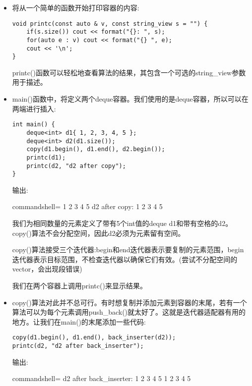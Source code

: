\begin{itemize}
\item 
将从一个简单的函数开始打印容器的内容:

\begin{lstlisting}[style=styleCXX]
void printc(const auto & v, const string_view s = "") {
	if(s.size()) cout << format("{}: ", s);
	for(auto e : v) cout << format("{} ", e);
	cout << '\n';
}
\end{lstlisting}

printc()函数可以轻松地查看算法的结果，其包含一个可选的string\_view参数用于描述。

\item 
main()函数中，将定义两个deque容器。我们使用的是deque容器，所以可以在两端进行插入:

\begin{lstlisting}[style=styleCXX]
int main() {
	deque<int> d1{ 1, 2, 3, 4, 5 };
	deque<int> d2(d1.size());
	copy(d1.begin(), d1.end(), d2.begin());
	printc(d1);
	printc(d2, "d2 after copy");
}
\end{lstlisting}

输出:

\begin{tcblisting}{commandshell={}}
1 2 3 4 5
d2 after copy: 1 2 3 4 5
\end{tcblisting}

我们为相同数量的元素定义了带有5个int值的deque d1和带有空格的d2。copy()算法不会分配空间，因此d2必须为元素留有空间。

copy()算法接受三个迭代器:begin和end迭代器表示要复制的元素范围，begin迭代器表示目标范围，不检查迭代器以确保它们有效。(尝试不分配空间的vector，会出现段错误)

我们在两个容器上调用printc()来显示结果。

\item 
copy()算法对此并不总可行。有时想复制并添加元素到容器的末尾，若有一个算法可以为每个元素调用push\_back()就太好了。这就是迭代器适配器有用的地方。让我们在main()的末尾添加一些代码:

\begin{lstlisting}[style=styleCXX]
copy(d1.begin(), d1.end(), back_inserter(d2));
printc(d2, "d2 after back_inserter");
\end{lstlisting}

输出:

\begin{tcblisting}{commandshell={}}
d2 after back_inserter: 1 2 3 4 5 1 2 3 4 5
\end{tcblisting}


\end{itemize}
